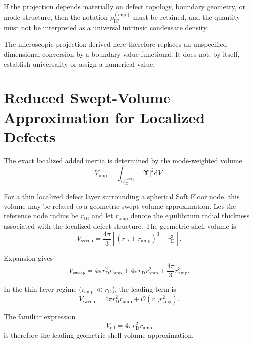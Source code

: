 If the projection depends materially on defect topology, boundary geometry, or mode structure, then the notation $\rho_{\mathrm{IC}}^{(\mathrm{imp})}$ must be retained, and the quantity must not be interpreted as a universal intrinsic condensate density.

The microscopic projection derived here therefore replaces an unspecified dimensional conversion by a boundary-value functional. It does not, by itself, establish universality or assign a numerical value.

\section{Reduced Swept-Volume Approximation for Localized Defects}

The exact localized added inertia is determined by the mode-weighted volume
\begin{equation}
    V_{\mathrm{imp}} = \int_{\Omega_{\mathrm{IC}}^{(\mathrm{def})}} |\boldsymbol{\Upsilon}|^2 \mathrm{d}V.
\end{equation}

For a thin localized defect layer surrounding a spherical Soft Floor node, this volume may be related to a geometric swept-volume approximation. Let the reference node radius be $r_{\mathrm{D}}$, and let $r_{\mathrm{amp}}$ denote the equilibrium radial thickness associated with the localized defect structure. The geometric shell volume is
\begin{equation}
    V_{\mathrm{sweep}} = \frac{4\pi}{3} \left[ (r_{\mathrm{D}}+r_{\mathrm{amp}})^3 - r_{\mathrm{D}}^3 \right].
\end{equation}

Expansion gives
\begin{equation}
    V_{\mathrm{sweep}} = 4\pi r_{\mathrm{D}}^2r_{\mathrm{amp}} + 4\pi r_{\mathrm{D}}r_{\mathrm{amp}}^2 + \frac{4\pi}{3}r_{\mathrm{amp}}^3.
\end{equation}

In the thin-layer regime ($r_{\mathrm{amp}} \ll r_{\mathrm{D}}$), the leading term is
\begin{equation}
    V_{\mathrm{sweep}} = 4\pi r_{\mathrm{D}}^2r_{\mathrm{amp}} + \mathcal{O} \left( r_{\mathrm{D}}r_{\mathrm{amp}}^2 \right).
\end{equation}

The familiar expression
\begin{equation}
    V_{\mathrm{eff}} = 4\pi r_{\mathrm{D}}^2r_{\mathrm{amp}}
\end{equation}
is therefore the leading geometric shell-volume approximation.

